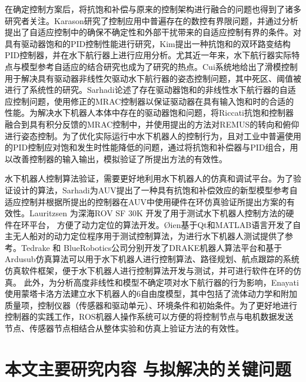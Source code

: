在确定控制方案后，将抗饱和补偿与原来的控制架构进行融合的问题也得到了诸多研究者关注\cite{oliveira2013design,sofrony2007anti,Chen2009Neural}。Karason研究了控制应用中普遍存在的数控有界限问题，并通过分析提出了自适应控制中的确保不确定性和外部干扰带来的自适应控制有界的条件\cite{karason1993adaptive}。对具有驱动器饱和的PID控制性能进行研究，Kim提出一种抗饱和的双环路变结构PID控制器，并在水下航行器上进行应用分析\cite{kim2013variable}。尤其近一年来，水下航行器实际特点与模型参考自适应的结合研究也成为了研究的热点。Cui系统地给出了滑模控制用于解决具有驱动器非线性欠驱动水下航行器的姿态控制问题，其中死区、阈值被进行了系统性的研究\cite{cui2016adaptive}。Sarhadi论述了存在驱动器饱和的非线性水下航行器的自适应控制问题，使用修正的MRAC控制器以保证驱动器在具有输入饱和时的合适的性能\cite{sarhadi2016adaptive1}。为解决水下机器人本体中存在的驱动器饱和问题，将Riccati抗饱和控制器融合到具有积分反馈的MRAC控制中，并使用提出的方法对REMUS的转向和俯仰进行姿态控制\cite{sarhadi2016adaptive2}。为了优化实际运行中水下机器人的控制行为，且对工业中普遍使用的PID控制应对饱和发生时性能降低的问题，通过将抗饱和补偿器与PID组合，用以改善控制器的输入输出，模拟验证了所提出方法的有效性\cite{sarhadi2016model1}。

水下机器人控制算法验证，需要更好地利用水下机器人的仿真和调试平台。为了验证设计的算法，Sarhadi为AUV提出了一种具有抗饱和补偿效应的新型模型参考自适应控制并根据所提出的控制器在AUV中使用硬件在环仿真验证所提出方案的有效性\cite{sarhadi2015state,sarhadi2017model2,hsu2000dynamic}。Lauritzsen 为深海ROV SF 30K 开发了用于测试水下机器人控制方法的硬件在环平台， 方便了动力定位的算法开发\cite{lauritzsen2014hardware,smallwood2004model}。{\O}ien基于Qt和MATLAB语言开发了自主无人船对的动力定位程序用于测试控制算法，为进行水下机器人测试提供了参考\cite{oien2016dynamic}。Tedrake 和 BlueRobotics公司分别开发了DRAKE机器人算法平台和基于Ardusub仿真算法可以用于水下机器人进行控制算法、路径规划、航点跟踪的系统仿真软件框架，便于水下机器人进行控制算法开发与测试，并可进行软件在环的仿真\cite{drake2016,ardusub,ardupilot,arnesen20173d,rohmer2013vrep,tedrake2009lqr,tedrake2010lqr}。 此外，为分析高度非线性和模型不确定项对水下航行器的行为影响，Enayati使用蒙塔卡洛方法建立水下机器人的6自由度模型，其中包括了流体动力学和附加质量项，控制仪器（传感器和驱动单元）、环境条件和初始条件\cite{enayati2016monte}。为了更好地进行控制器的实践工作，ROS机器人操作系统可以方便的将控制节点与电机数据发送节点、传感器节点相结合从整体实验和仿真上验证方法的有效性\cite{dhurandher2008uwsim,xu2005simulation}。


\section{本文主要研究内容 与拟解决的关键问题 }

